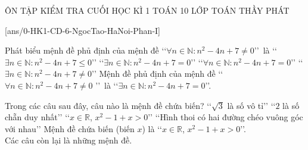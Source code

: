 ﻿\begin{name}
	{ÔN TẬP KIỂM TRA CUỐI HỌC KÌ 1}
	{TOÁN 10}
	{LỚP TOÁN THẦY PHÁT}
	{\thoigian}
\end{name}
\caulc
{}[ans/0-HK1-CD-6-NgocTao-HaNoi-Phan-I]

\begin{ex}%
Phát biểu mệnh đề phủ định của mệnh đề \lq\lq $\forall n\in \mathbb{N} \colon n^2-4n+7\ne 0$\rq\rq \ là
\choice
{\lq\lq $\exists n\in \mathbb{N} \colon n^2-4n+7\le 0$\rq\rq}
{\True \lq\lq $\exists n\in \mathbb{N} \colon n^2-4n+7=0$\rq\rq}
{\lq\lq $\forall n\in \mathbb{N} \colon n^2-4n+7=0$\rq\rq}
{\lq\lq $\exists n\in \mathbb{N} \colon n^2-4n+7\ne 0$\rq\rq}
\loigiai
{Mệnh đề phủ định của mệnh đề \lq\lq $\forall n\in \mathbb{N} \colon n^2-4n+7\ne 0$ \rq\rq \ là
\lq\lq $\exists n\in \mathbb{N} \colon n^2-4n+7=0$\rq\rq.}
\end{ex}

\begin{ex}%
Trong các câu sau đây, câu nào là mệnh đề chứa biến?
\choice
{\lq\lq $\sqrt{3}$ là số vô tỉ\rq\rq}
{\lq\lq $2$ là số chẵn duy nhất\rq\rq}
{\True \lq\lq $x\in \mathbb{R}$, $x^2-1+x>0$\rq\rq}
{\lq\lq Hình thoi có hai đường chéo vuông góc với nhau\rq\rq}
\loigiai
{Mệnh đề chứa biến (biến $x$) là \lq\lq $x\in \mathbb{R}$, $x^2-1+x>0$\rq\rq. \\
Các câu còn lại là những mệnh đề.}
\end{ex}

